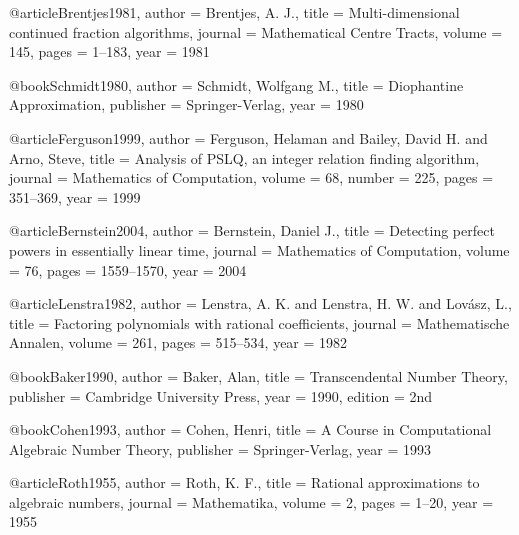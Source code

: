 @article{Brentjes1981,
  author = {Brentjes, A. J.},
  title = {Multi-dimensional continued fraction algorithms},
  journal = {Mathematical Centre Tracts},
  volume = {145},
  pages = {1--183},
  year = {1981}
}

@book{Schmidt1980,
  author = {Schmidt, Wolfgang M.},
  title = {Diophantine Approximation},
  publisher = {Springer-Verlag},
  year = {1980}
}

@article{Ferguson1999,
  author = {Ferguson, Helaman and Bailey, David H. and Arno, Steve},
  title = {Analysis of PSLQ, an integer relation finding algorithm},
  journal = {Mathematics of Computation},
  volume = {68},
  number = {225},
  pages = {351--369},
  year = {1999}
}

@article{Bernstein2004,
  author = {Bernstein, Daniel J.},
  title = {Detecting perfect powers in essentially linear time},
  journal = {Mathematics of Computation},
  volume = {76},
  pages = {1559--1570},
  year = {2004}
}

@article{Lenstra1982,
  author = {Lenstra, A. K. and Lenstra, H. W. and Lovász, L.},
  title = {Factoring polynomials with rational coefficients},
  journal = {Mathematische Annalen},
  volume = {261},
  pages = {515--534},
  year = {1982}
}

@book{Baker1990,
  author = {Baker, Alan},
  title = {Transcendental Number Theory},
  publisher = {Cambridge University Press},
  year = {1990},
  edition = {2nd}
}

@book{Cohen1993,
  author = {Cohen, Henri},
  title = {A Course in Computational Algebraic Number Theory},
  publisher = {Springer-Verlag},
  year = {1993}
}

@article{Roth1955,
  author = {Roth, K. F.},
  title = {Rational approximations to algebraic numbers},
  journal = {Mathematika},
  volume = {2},
  pages = {1--20},
  year = {1955}
}
